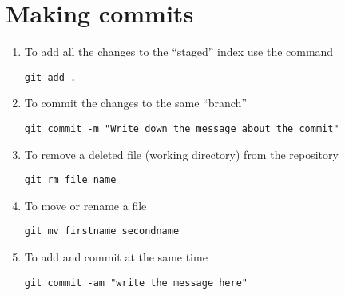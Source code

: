 \documentclass[paper=a4, fontsize=12pt]{scrartcl}
\begin{document}
\section*{Making commits}
\begin{enumerate}
\item To add all the changes to the ``staged'' index use the command
\begin{lstlisting}
git add .
\end{lstlisting}
\item To commit the changes to the same ``branch''
\begin{lstlisting}
git commit -m "Write down the message about the commit"
\end{lstlisting}
\item To remove a deleted file (working directory) from the repository
\begin{lstlisting}
git rm file_name
\end{lstlisting}
\item To move or rename a file
\begin{lstlisting}
git mv firstname secondname
\end{lstlisting}
\item To add and commit at the same time
\begin{lstlisting}
git commit -am "write the message here"
\end{lstlisting}
\end{enumerate}
\end{document}
